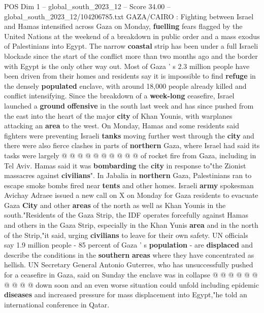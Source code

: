 \begin{textsample}{POS Dim 1 – global\_south\_2023\_12 – Score 34.00 – global\_south\_2023\_12/104206785.txt}  \label{ex:f1_pos_040}
GAZA/CAIRO : Fighting between Israel and Hamas intensified across Gaza on Monday, \textbf{fuelling} fears flagged by the United Nations at the weekend of a breakdown in public order and a mass exodus of Palestinians into Egypt.
The narrow \textbf{coastal} strip has been under a full Israeli blockade since the start of the conflict more than two months ago and the border with Egypt is the only other way out.
Most of Gaza ' s 2.3 million people have been driven from their homes and residents say it is impossible to find \textbf{refuge} in the densely \textbf{populated} enclave, with around 18,000 people already killed and conflict intensifying.
Since the breakdown of a \textbf{week-long} ceasefire, Israel launched a \textbf{ground} \textbf{offensive} in the south last week and has since pushed from the east into the heart of the major \textbf{city} of Khan Younis, with warplanes attacking an \textbf{area} to the west.
On Monday, Hamas and some residents said fighters were preventing Israeli \textbf{tanks} moving further west through the \textbf{city} and there were also fierce clashes in parts of \textbf{northern} Gaza, where Israel had said its tasks were largely @ @ @ @ @ @ @ @ @ @ of rocket fire from Gaza, including in Tel Aviv.
Hamas said it was \textbf{bombarding} the \textbf{city} in response to"the Zionist massacres against \textbf{civilians}".
In Jabalia in \textbf{northern} Gaza, Palestinians ran to escape smoke bombs fired near \textbf{tents} and other homes.
Israeli \textbf{army} spokesman Avichay Adraee issued a new call on X on Monday for Gaza residents to evacuate Gaza \textbf{City} and other \textbf{areas} of the north as well as Khan Younis in the south."Residents of the Gaza Strip, the IDF operates forcefully against Hamas and others in the Gaza Strip, especially in the Khan Yunis \textbf{area} and in the north of the Strip,"it said, urging \textbf{civilians} to leave for their own safety.
UN officials say 1.9 million people - 85 percent of Gaza ' s \textbf{population} - are \textbf{displaced} and describe the conditions in the \textbf{southern} \textbf{areas} where they have concentrated as hellish.
UN Secretary General Antonio Guterres, who has unsuccessfully pushed for a ceasefire in Gaza, said on Sunday the enclave was in collapse @ @ @ @ @ @ @ @ @ @ down soon and an even worse situation could unfold including epidemic \textbf{diseases} and increased pressure for mass displacement into Egypt,"he told an international conference in Qatar.

\end{textsample}
